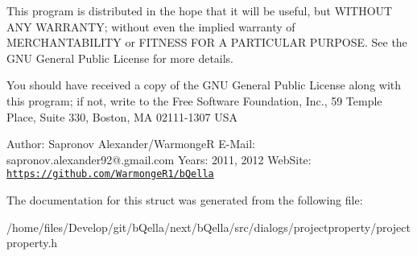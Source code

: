 This program is distributed in the hope that it will be useful, but WITHOUT ANY WARRANTY; without even the implied warranty of MERCHANTABILITY or FITNESS FOR A PARTICULAR PURPOSE. See the GNU General Public License for more details.

You should have received a copy of the GNU General Public License along with this program; if not, write to the Free Software Foundation, Inc., 59 Temple Place, Suite 330, Boston, MA 02111-\/1307 USA

Author: Sapronov Alexander/WarmongeR E-\/Mail: sapronov.alexander92@.gmail.com Years: 2011, 2012 WebSite: \href{https://github.com/WarmongeR1/bQella}{\tt https://github.com/WarmongeR1/bQella} 

The documentation for this struct was generated from the following file:\begin{DoxyCompactItemize}
\item 
/home/files/Develop/git/bQella/next/bQella/src/dialogs/projectproperty/projectproperty.h\end{DoxyCompactItemize}
